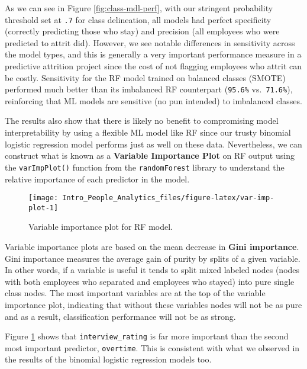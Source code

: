 \documentclass[
]{book}
\begin{document}
As we can see in Figure \ref{fig:class-mdl-perf}, with our stringent probability threshold set at \texttt{.7} for class delineation, all models had perfect specificity (correctly predicting those who stay) and precision (all employees who were predicted to attrit did). However, we see notable differences in sensitivity across the model types, and this is generally a very important performance measure in a predictive attrition project since the cost of not flagging employees who attrit can be costly. Sensitivity for the RF model trained on balanced classes (SMOTE) performed much better than its imbalanced RF counterpart (\texttt{95.6\%} vs.~\texttt{71.6\%}), reinforcing that ML models are sensitive (no pun intended) to imbalanced classes.

The results also show that there is likely no benefit to compromising model interpretability by using a flexible ML model like RF since our trusty binomial logistic regression model performs just as well on these data. Nevertheless, we can construct what is known as a \textbf{Variable Importance Plot} on RF output using the \texttt{varImpPlot()} function from the \texttt{randomForest} library to understand the relative importance of each predictor in the model.

\begin{figure}

{\centering \texttt{[image: Intro\_People\_Analytics\_files/figure-latex/var-imp-plot-1]} 

}

\caption{Variable importance plot for RF model.}\label{fig:var-imp-plot}
\end{figure}

Variable importance plots are based on the mean decrease in \textbf{Gini importance}. Gini importance measures the average gain of purity by splits of a given variable. In other words, if a variable is useful it tends to split mixed labeled nodes (nodes with both employees who separated and employees who stayed) into pure single class nodes. The most important variables are at the top of the variable importance plot, indicating that without these variables nodes will not be as pure and as a result, classification performance will not be as strong.

Figure \ref{fig:var-imp-plot} shows that \texttt{interview\_rating} is far more important than the second most important predictor, \texttt{overtime}. This is consistent with what we observed in the results of the binomial logistic regression models too.
\end{document}
